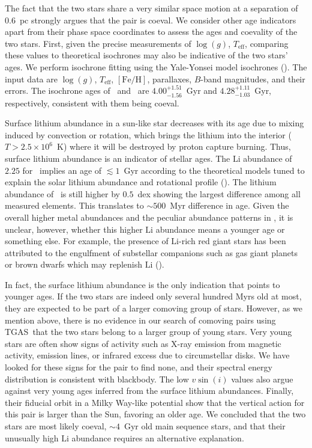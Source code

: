 \documentclass[manuscript]{aastex6}
\newcommand{\acronym}[1]{{\small{#1}}}
\newcommand{\tgas}{\acronym{TGAS}}
\newcommand*\elem[1]{\ensuremath{\mathrm{#1}}}
\newcommand*\elemH[1]{\ensuremath{[\mathrm{#1}/\elem{H}]}}
\newcommand*{\feh}{\ensuremath{\elemH{Fe}}}
\newcommand{\sunanalog}{\text{Krios}}
\newcommand{\bizarreone}{\text{Kronos}}
\begin{document}
The fact that the two stars share a very similar space motion
at a separation of $0.6$~pc strongly argues that the pair is coeval.
We consider other age indicators apart from their phase space coordinates
to assess the ages and coevality of the two stars.
First, given the precise measurements of $\log(g)$, $T_\mathrm{eff}$,
comparing these values to theoretical isochrones may also be indicative of the two stars' ages.
We perform isochrone fitting using the Yale-Yonsei model isochrones (\citealt{2013ApJ...776...87S}).
The input data are $\log(g)$, $T_\mathrm{eff}$, \feh, parallaxes, $B$-band magnitudes, and their errors.
The isochrone ages of \sunanalog\ and \bizarreone\ are
$4.00_{-1.56}^{+1.51}$~Gyr and $4.28_{-1.03}^{+1.11}$~Gyr, respectively,
consistent with them being coeval.

Surface lithium abundance in a sun-like star decreases with its age
due to mixing induced by convection or rotation, which brings the lithium
into the interior ($T>2.5 \times 10^{6}$~K)
where it will be destroyed by proton capture burning.
Thus, surface lithium abundance is an indicator of stellar ages.
The $\elem{Li}$ abundance of $2.25$ for \sunanalog\ implies an age of $\lesssim 1$~Gyr
according to the theoretical models tuned to explain the solar lithium abundance
and rotational profile (\citealt{2005Sci...309.2189C}).
The lithium abundance of \bizarreone\ is still higher by $0.5$~dex
showing the largest difference among all measured elements.
This translates to $\sim 500$~Myr difference in age.
Given the overall higher metal abundances and the peculiar abundance patterns in \bizarreone,
it is unclear, however, whether this higher $\elem{Li}$ abundance
means a younger age or something else.
For example, the presence of $\elem{Li}$-rich red giant stars has been attributed
to the engulfment of substellar companions such as gas giant planets or brown dwarfs
which may replenish $\elem{Li}$ (\citealt{Casey:2016aa}).

In fact, the surface lithium abundance is the only indication that points to younger ages.
If the two stars are indeed only several hundred Myrs old at most,
they are expected to be part of a larger comoving group of stars.
However, as we mention above, there is no evidence in our search of comoving pairs
using \tgas\ that the two stars belong to a larger group of young stars.
Very young stars are often show signs of activity such as
X-ray emission from magnetic activity, emission lines, or infrared excess due to
circumstellar disks.
We have looked for these signs for the pair to find none, and their spectral energy
distribution is consistent with blackbody.
The low $v\sin(i)$ values also argue against very young ages inferred from the
surface lithium abundances.
Finally, their fiducial orbit in a Milky Way-like potential show that the vertical action
for this pair is larger than the Sun, favoring an older age.
We concluded that the two stars are most likely coeval, $\sim 4$~Gyr old main sequence
stars, and that their unusually high \elem{Li} abundance requires an alternative explanation.
\end{document}
